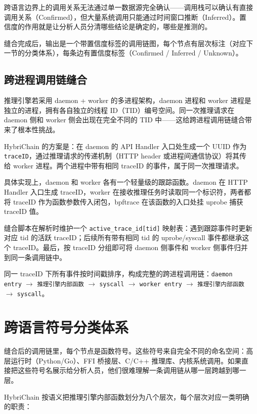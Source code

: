 跨语言边界上的调用关系无法通过单一数据源完全确认——调用栈可以确认有直接调用关系（Confirmed），但大量系统调用只能通过时间窗口推断（Inferred）。置信度的作用就是让分析人员分清哪些结论是确定的，哪些是推测的。

缝合完成后，输出是一个带置信度标签的调用链图，每个节点有层次标注（对应下一节的分类体系），每条边有置信度标签（Confirmed / Inferred / Unknown）。

\subsection{跨进程调用链缝合}

推理引擎若采用 daemon + worker 的多进程架构，daemon 进程和 worker 进程是独立的进程，拥有各自独立的线程 ID（TID）编号空间。同一次推理请求在 daemon 侧和 worker 侧会出现在完全不同的 TID 中——这给跨进程调用链缝合带来了根本性挑战。

HybriChain 的方案是：在 daemon 的 API Handler 入口处生成一个 UUID 作为 \texttt{traceID}，通过推理请求的传递机制（HTTP header 或进程间通信协议）将其传给 worker 进程。两个进程中带有相同 traceID 的事件，属于同一次推理请求。

具体实现上，daemon 和 worker 各有一个轻量级的跟踪函数。daemon 在 HTTP Handler 入口生成 traceID，worker 在接收推理任务时读取同一个标识符，两者都将 traceID 作为函数参数传入闭包，bpftrace 在该函数的入口处挂 uprobe 捕获 traceID 值。

缝合脚本在解析时维护一个 \texttt{active\_trace\_id[tid]} 映射表：遇到跟踪事件时更新对应 tid 的活跃 traceID；后续所有带有相同 tid 的 uprobe/syscall 事件都继承这个 traceID。最后，按 traceID 分组即可将 daemon 侧事件和 worker 侧事件归并到同一条调用链中。

同一 traceID 下所有事件按时间戳排序，构成完整的跨进程调用链：\texttt{daemon entry} $\to$ \texttt{推理引擎内部函数} $\to$ \texttt{syscall} $\to$ \texttt{worker entry} $\to$ \texttt{推理引擎内部函数} $\to$ \texttt{syscall}。

\section{跨语言符号分类体系}

缝合后的调用链里，每个节点是函数符号。这些符号来自完全不同的命名空间：高层运行时（Python/Go）、FFI 桥接层、C/C++ 推理库、内核系统调用。如果直接把这些符号名展示给分析人员，他们很难理解一条调用链从哪一层跨越到哪一层。

HybriChain 按语义把推理引擎内部函数划分为八个层次，每个层次对应一类明确的职责：

